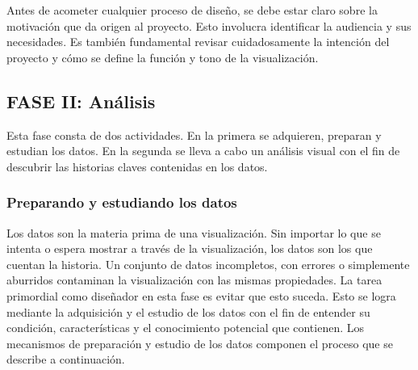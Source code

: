 Antes de acometer cualquier proceso de diseño, se debe estar claro sobre la motivación que da origen al proyecto. Esto involucra identificar la audiencia y sus necesidades. Es también fundamental revisar cuidadosamente la intención del proyecto y cómo se define la función y tono de la visualización.

\subsection{FASE II: Análisis}

Esta fase consta de dos actividades. En la primera se adquieren, preparan y estudian los datos. En la segunda se lleva a cabo un análisis visual con el fin de descubrir las historias claves contenidas en los datos.

\subsubsection{Preparando y estudiando los datos}

Los datos son la materia prima de una visualización. Sin importar lo que se intenta o espera mostrar a través de la visualización, los datos son los que cuentan la historia. Un conjunto de datos incompletos, con errores o simplemente aburridos contaminan la visualización con las mismas propiedades. La tarea primordial como diseñador en esta fase es evitar que esto suceda. Esto se logra mediante la adquisición y el estudio de los datos con el fin de entender su condición, características y el conocimiento potencial que contienen. Los mecanismos de preparación y estudio de los datos componen el proceso que se describe a continuación.

